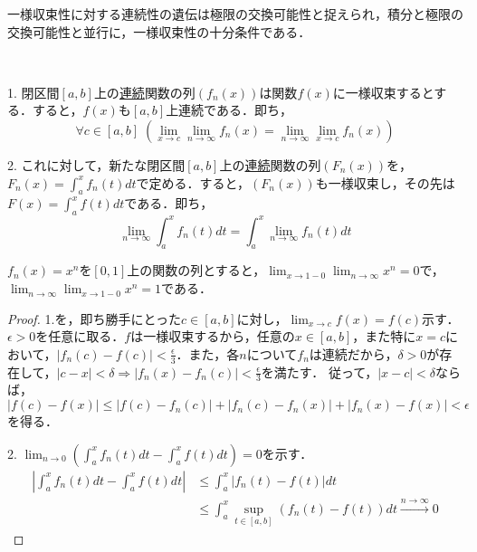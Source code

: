\documentclass[uplatex, dvipdfmx]{jsreport}
\begin{document}
一様収束性に対する連続性の遺伝は極限の交換可能性と捉えられ，積分と極限の交換可能性と並行に，一様収束性の十分条件である．
\begin{proposition}[極限の交換]\label{prop-uniform-convergence}　

    1. 閉区間$[a,b]$上の\underline{連続}関数の列$(f_n(x))$は関数$f(x)$に一様収束するとする．すると，$f(x)$も$[a,b]$上連続である．即ち，
    \[ \forall c\in [a,b]\; \left( \lim_{x\to c}\lim_{n\to\infty} f_n(x)= \lim_{n\to\infty}\lim_{x\to c}f_n(x) \right) \]

    2. これに対して，新たな閉区間$[a,b]$上の\underline{連続}関数の列$(F_n(x))$を，$F_n(x)=\int^x_af_n(t)dt$で定める．すると，$(F_n(x))$も一様収束し，その先は$F(x)=\int^x_af(t)dt$である．即ち，
    \[ \lim_{n\to\infty} \int^x_af_n(t)dt = \int^x_a\lim_{n\to\infty}f_n(t)dt \]
\end{proposition}
\begin{example*}
    $f_n(x)=x^n$を$[0,1]$上の関数の列とすると，$\lim_{x\to 1-0}\lim_{n\to\infty}x^n=0$で，$\lim_{n\to\infty}\lim_{x\to 1-0}x^n=1$である．
\end{example*}
\begin{proof}
    1.を，即ち勝手にとった$c\in [a,b]$に対し，$\lim_{x\to c}f(x)=f(c)$示す．$\epsilon>0$を任意に取る．$f$は一様収束するから，任意の$x\in [a,b]$，また特に$x=c$において，$|f_n(c)-f(c)|<\frac{\epsilon}{3}$．また，各$n$について$f_n$は連続だから，$\delta>0$が存在して，$|c-x|<\delta\Rightarrow |f_n(x)-f_n(c)|<\frac{\epsilon}{3}$を満たす．
    従って，$|x-c|<\delta$ならば，$|f(c)-f(x)|\le |f(c)-f_n(c)|+ |f_n(c)-f_n(x)|+|f_n(x)-f(x)|<\epsilon$を得る．

    2. $\lim_{n\to 0}\left(\int^x_af_n(t)dt-\int^x_af(t)dt\right)=0$を示す．
    \begin{align*}
        \left| \int^x_af_n(t)dt-\int^x_af(t)dt \right| &\le \int^x_a|f_n(t)-f(t)|dt \\
        &\le \int^x_a\sup_{t\in [a,b]}(f_n(t)-f(t))dt \xrightarrow{n\to\infty} 0
    \end{align*}
\end{proof}
\end{document}
